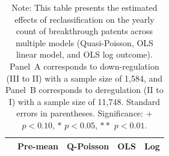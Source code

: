 \documentclass[letterpaper,12pt]{article}
\theoremstyle{definition}
\begin{document}
 

\clearpage
\newpage
\begin{table}[h!]
\centering
\caption{\textbf{Effect of Reclassification on Breakthrough Patents}}
\label{tab:BreakthroughPatentsEffects}
\begin{tabular}{lcccc}
\toprule
 & Pre-mean & Q-Poisson & OLS & Log \\
\midrule

\bottomrule
\end{tabular}
\caption*{\footnotesize
Note: This table presents the estimated effects of reclassification on the yearly count of breakthrough patents across multiple models (Quasi-Poisson, OLS linear model, and OLS log outcome). Panel~A corresponds to down-regulation (III to II) with a sample size of 1,584, and Panel~B corresponds to deregulation (II to I) with a sample size of 11,748. Standard errors in parentheses. Significance: $+$ $p<0.10$, $*$ $p<0.05$, $**$ $p<0.01$.}
\end{table}








\end{document}
